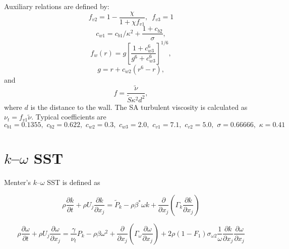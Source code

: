 Auxiliary relations are defined by:
\begin{equation}
    f_{v2} = 1 - \frac{\chi}{1 + \chi f_{v1}}, \, \, \,
    f_{v3} = 1
\end{equation}
\begin{equation}
    c_{w1} = c_{b1}/\kappa^2 + \frac{1 + c_{b2}}{\sigma},
\end{equation}
\begin{equation}
    f_w(r) = g \left[ \frac{1 + c_{w3}^6}{g^6 + c_{w3}^6} \right]^{1/6},
\end{equation}
\begin{equation}
    g = r + c_{w2} (r^6 - r),
\end{equation}
and
\begin{equation}
    f = \frac{\tilde{\nu}}{\tilde{S} \kappa^2 d^2},
\end{equation}
where $d$ is the distance to the wall. The SA turbulent viscosity is calculated
as $\nu_t = f_{v1} \tilde{\nu}$. Typical coefficients are
\begin{equation}
    c_{b1} = 0.1355, \, \,
    c_{b2} = 0.622, \, \,
    c_{w2} = 0.3, \, \,
    c_{w3} = 2.0, \, \,
    c_{v1} = 7.1, \, \,
    c_{v2} = 5.0, \, \,
    \sigma = 0.66666, \, \,
    \kappa = 0.41
\end{equation}


\section{$k$--$\omega$ SST}

Menter's $k$--$\omega$ SST is defined as \cite{Menter2001}

\begin{equation}
    \rho \frac{\partial k}{\partial t}
    + \rho U_j \frac{\partial k}{\partial x_j}
    = \tilde{P}_k - \rho \beta^* \omega k
    + \frac{\partial}{\partial x_j}
    \left(
    \Gamma_k \frac{\partial k}{\partial x_j}
    \right)
    \label{eq:komegasst-k}
\end{equation}

\begin{equation}
    \rho \frac{\partial \omega}{\partial t}
    + \rho U_j \frac{\partial \omega}{\partial x_j}
    = \frac{\gamma}{\nu_t} P_k - \rho \beta \omega^2
    + \frac{\partial}{\partial x_j}
    \left(
    \Gamma_\omega \frac{\partial \omega}{\partial x_j}
    \right)
    + 2 \rho (1 - F_1) \sigma_{\omega 2}
    \frac{1}{\omega} \frac{\partial k}{\partial x_j}
    \frac{\partial \omega}{\partial x_j}
\end{equation}

